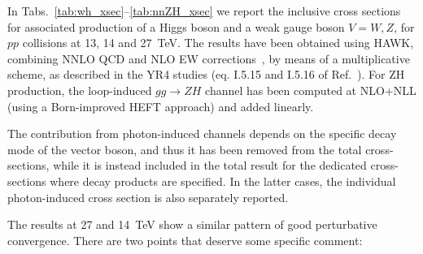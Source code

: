 In Tabs.~\ref{tab:wh_xsec}--\ref{tab:nnZH_xsec}
we report the inclusive cross sections for associated production of a Higgs
boson and a weak gauge boson $V=W,Z$, for $pp$ collisions at 13, 14 and 27~TeV.
The results have been obtained using HAWK, combining
NNLO QCD and NLO EW
corrections~\cite{Harlander:2018yio,Denner:2014cla,Harlander:2014wda,
Altenkamp:2012sx,Denner:2011id,Brein:2003wg,Ciccolini:2003jy}, by
means of a multiplicative scheme, as described in the YR4 studies (eq.
I.5.15 and I.5.16 of Ref.~\cite{deFlorian:2016spz}).  For ZH production, the
loop-induced $gg\rightarrow ZH$ channel has been computed at NLO+NLL (using a Born-improved HEFT approach) and added linearly.

The contribution from photon-induced channels depends on the specific
decay mode of the vector boson, and thus it has been removed from the
total cross-sections, while it is instead included in the total result
for the dedicated cross-sections where decay products are
specified. In the latter cases, the individual photon-induced cross
section is also separately reported.

The results at 27 and 14~TeV show a similar pattern of good
perturbative convergence. There are two points that deserve some
specific comment:

